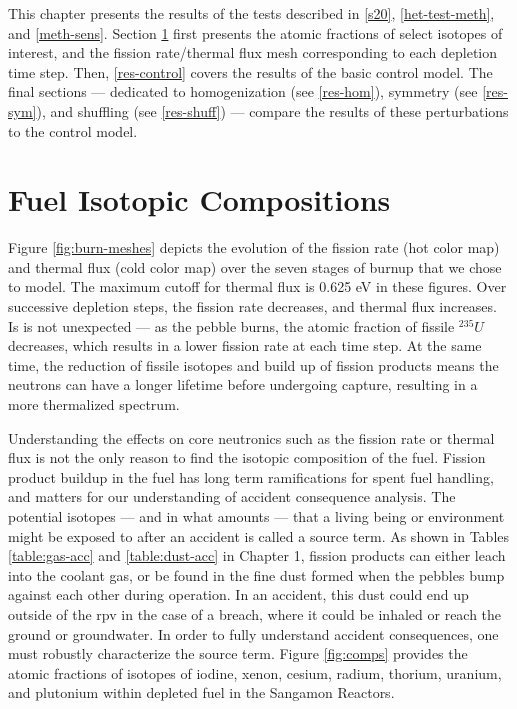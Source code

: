 \label{res}
This chapter presents the results of the tests described in \autoref{s20},  \ref{het-test-meth}, and  \ref{meth-sens}.  Section \ref{res-comps} first presents the atomic fractions of select isotopes of interest, and the fission rate/thermal flux mesh corresponding to each depletion time step.  Then, \autoref{res-control} covers the results of the basic control model. The final sections --- dedicated to homogenization (see \autoref{res-hom}), symmetry (see \autoref{res-sym}), and shuffling (see \autoref{res-shuff}) --- compare the results of these perturbations to the control model.

\section{Fuel Isotopic Compositions}
\label{res-comps}

Figure \ref{fig:burn-meshes} depicts the evolution of the fission rate (hot color map) and thermal flux (cold color map) over the seven stages of burnup that we chose to model.  The maximum cutoff for thermal flux is 0.625 eV in these figures.  Over successive depletion steps, the fission rate decreases, and thermal flux increases.  Is is not unexpected --- as the pebble burns, the atomic fraction of fissile $^{235}U$ decreases, which results in a lower fission rate at each time step.  At the same time, the reduction of fissile isotopes and build up of fission products means the neutrons can have a longer lifetime before undergoing capture, resulting in a more thermalized spectrum.



Understanding the effects on core neutronics such as the fission rate or thermal flux is not the only reason to find the isotopic composition of the fuel.  Fission product buildup in the fuel has long term ramifications for spent fuel handling, and matters for our understanding of accident consequence analysis.  The potential isotopes --- and in what amounts --- that a living being or environment might be exposed to after an accident is called a source term.  As shown in Tables \ref{table:gas-acc} and \ref{table:dust-acc} in Chapter 1, fission products can either leach into the coolant gas, or be found in the fine dust formed when the pebbles bump against each other during operation.  In an accident, this dust could end up outside of the \acrshort{rpv} in the case of a breach, where it could be inhaled or reach the ground or groundwater.  In order to fully understand accident consequences, one must robustly characterize the source term.  Figure \ref{fig:comps} provides the atomic fractions of isotopes of iodine, xenon, cesium, radium, thorium, uranium, and plutonium within depleted fuel in the Sangamon Reactors.

